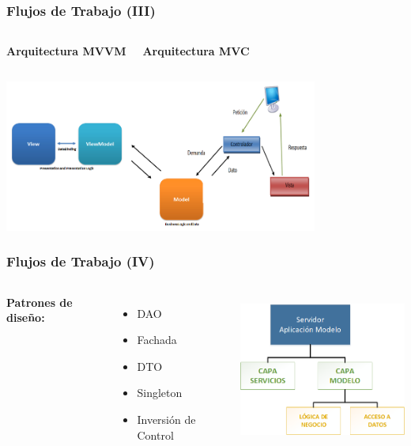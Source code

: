 \documentclass[usenames,dvipsnames]{beamer}
\begin{document}
\begin{frame}
\frametitle{Flujos de Trabajo (III)}
\begin{columns}[c] %
\centering
\textbf{Arquitectura MVVM}

\centering
\textbf{Arquitectura MVC}
\end{columns}
\vspace{0.3cm}


\centering
\includegraphics[height=5cm]{./img/MVVM.png}

\end{frame}

\begin{frame}
\frametitle{Flujos de Trabajo (IV)}

\begin{columns}[c] %

\textbf{Patrones de diseño:}
\begin{itemize}
	\item DAO
	\item Fachada
	\item DTO
	\item Singleton
	\item Inversión de Control
\end{itemize}

\includegraphics[height=5cm]{./img/arqmodelo.png}

\end{columns}
\end{frame}
\end{document}
